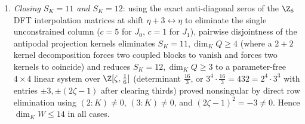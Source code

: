 \begin{outline}
\begin{enumerate}[label=\arabic*.,leftmargin=1.5em]
  induced map $Q \to (V_a / K_a) \oplus (V_{a+3} / K_{a+3})$ is injective for each $a \in \{0,1,2\}$.
  Summing $\dim_K Q \le 8 - \dim_K K_a - \dim_K K_{a+3}$ over $a \in \{0,1,2\}$ yields
  $3\dim_K Q + S_K \le 24$. Whenever $S_K \le 10$, this immediately gives
  $\dim_K W = S_K + \dim_K Q \le S_K + \lfloor(24 - S_K)/3\rfloor \le 14$.
\item \emph{Closing $S_K = 11$ and $S_K = 12$}: using the exact anti-diagonal zeros of the $\Z_6$ DFT
  interpolation matrices at shift $\eta + 3 \leftrightarrow \eta$ to eliminate the single unconstrained
  column ($c = 5$ for $J_0$, $c = 1$ for $J_1$), pairwise disjointness of the antipodal projection
  kernels eliminates $S_K = 11, \dim_K Q \ge 4$ (where a $2 + 2$ kernel decomposition forces two coupled
  blocks to vanish and forces two kernels to coincide) and reduces $S_K = 12, \dim_K Q \ge 3$ to a
  parameter-free $4 \times 4$ linear system over $\Z[\zeta, \frac{1}{6}]$ (determinant $\frac{16}{3}$,
  or $3^4 \cdot \frac{16}{3} = 432 = 2^4 \cdot 3^3$ with entries $\pm 3, \pm(2\zeta - 1)$ after clearing
  thirds) proved nonsingular by direct row elimination using $(2 : K) \ne 0$, $(3 : K) \ne 0$, and
  $(2\zeta - 1)^2 = -3 \ne 0$. Hence $\dim_K W \le 14$ in all cases.
\end{enumerate}
\end{outline}

